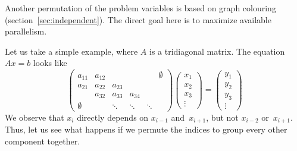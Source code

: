 
Another permutation of the problem variables is based on graph colouring
(section~\ref{sec:independent}). The direct goal here is to maximize
available parallelism.

Let us take a
simple example, where $A$ is a tridiagonal matrix. The equation $Ax=b$
looks like
\[ 
\begin{pmatrix}
  a_{11}&a_{12}&&&&\emptyset\\ a_{21}&a_{22}&a_{23}\\ 
  &a_{32}&a_{33}&a_{34}\\ \emptyset&&\ddots&\ddots&\ddots
\end{pmatrix}
\begin{pmatrix}  x_1\\ x_2\\ x_3\\ \vdots\end{pmatrix} =
\begin{pmatrix}  y_1\\ y_2\\ y_3\\ \vdots\end{pmatrix}
\]
We observe that $x_i$ directly depends on $x_{i-1}$ and~$x_{i+1}$, but
not $x_{i-2}$ or~$x_{i+1}$. Thus, let us see what happens if we
permute the indices to group every other component together.

